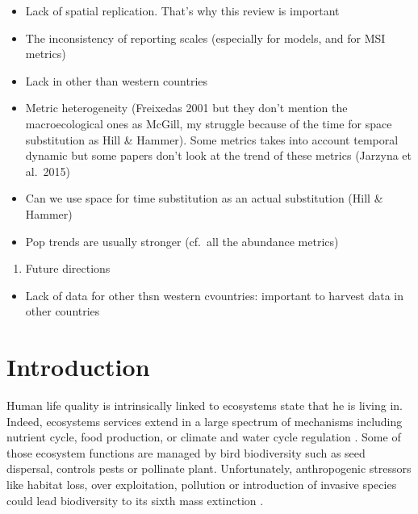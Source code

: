 \documentclass[
  12pt,
  oneside]{report}
\providecommand{\tightlist}{%
  \setlength{\itemsep}{0pt}\setlength{\parskip}{0pt}}
\begin{document}
\begin{itemize}
\tightlist
\item
  Lack of spatial replication. That's why this review is important
\item
  The inconsistency of reporting scales (especially for models, and for MSI metrics)
\item
  Lack in other than western countries
\item
  Metric heterogeneity (Freixedas 2001 but they don't mention the macroecological ones as McGill, my struggle because of the time for space substitution as Hill \& Hammer). Some metrics takes into account temporal dynamic but some papers don't look at the trend of these metrics (Jarzyna et al.~2015)
\item
  Can we use space for time substitution as an actual substitution (Hill \& Hammer)
\item
  Pop trends are usually stronger (cf.~all the abundance metrics)
\end{itemize}

\begin{enumerate}
\def\labelenumi{\arabic{enumi})}
\setcounter{enumi}{2}
\tightlist
\item
  Future directions
\end{enumerate}

\begin{itemize}
\tightlist
\item
  Lack of data for other thsn western cvountries: important to harvest data in other countries
\end{itemize}

\hypertarget{introduction}{%
\chapter{Introduction}\label{introduction}}

Human life quality is intrinsically linked to ecosystems state that he is living in. Indeed, ecosystems services extend in a large spectrum of mechanisms including nutrient cycle, food production, or climate and water cycle regulation \autocite{pereira_global_2012}. Some of those ecosystem functions are managed by bird biodiversity such as seed dispersal, controls pests or pollinate plant. Unfortunately, anthropogenic stressors like habitat loss, over exploitation, pollution or introduction of invasive species could lead biodiversity to its sixth mass extinction \autocite{barnosky_has_2011}.
\end{document}
